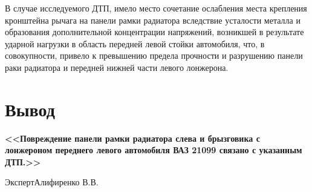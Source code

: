  В случае исследуемого ДТП, имело место  сочетание ослабления места крепления кронштейна  рычага на панели рамки радиатора вследствие  усталости металла и образования дополнительной концентрации напряжений, возникшей в результате ударной нагрузки в область передней левой стойки автомобиля, что, в совокупности, привело к превышению предела прочности и  разрушению панели раки радиатора и передней нижней части левого лонжерона.  

\section{Вывод} 


\textbf{  <<Повреждение панели рамки радиатора слева и брызговика с лонжероном переднего левого автомобиля ВАЗ 21099 связано  с указанным ДТП.>>	}
  
  
  \vspace{20mm}
{Эксперт}\hfill           {Алифиренко В.В.}


